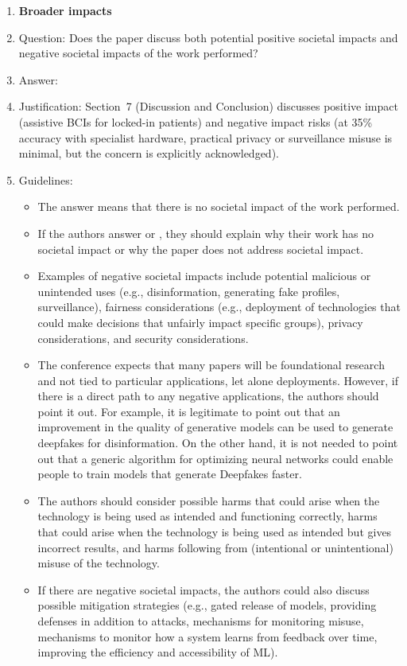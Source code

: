 \documentclass{article}
\begin{document}
\begin{enumerate}
\item {\bf Broader impacts}
    \item[] Question: Does the paper discuss both potential positive societal impacts and negative societal impacts of the work performed?
    \item[] Answer: \answerYes{}
    \item[] Justification: Section~7 (Discussion and Conclusion) discusses positive impact (assistive BCIs for locked-in patients) and negative impact risks (at 35\% accuracy with specialist hardware, practical privacy or surveillance misuse is minimal, but the concern is explicitly acknowledged).
    \item[] Guidelines:
    \begin{itemize}
        \item The answer \answerNA{} means that there is no societal impact of the work performed.
        \item If the authors answer \answerNA{} or \answerNo{}, they should explain why their work has no societal impact or why the paper does not address societal impact.
        \item Examples of negative societal impacts include potential malicious or unintended uses (e.g., disinformation, generating fake profiles, surveillance), fairness considerations (e.g., deployment of technologies that could make decisions that unfairly impact specific groups), privacy considerations, and security considerations.
        \item The conference expects that many papers will be foundational research and not tied to particular applications, let alone deployments. However, if there is a direct path to any negative applications, the authors should point it out. For example, it is legitimate to point out that an improvement in the quality of generative models can be used to generate deepfakes for disinformation. On the other hand, it is not needed to point out that a generic algorithm for optimizing neural networks could enable people to train models that generate Deepfakes faster.
        \item The authors should consider possible harms that could arise when the technology is being used as intended and functioning correctly, harms that could arise when the technology is being used as intended but gives incorrect results, and harms following from (intentional or unintentional) misuse of the technology.
        \item If there are negative societal impacts, the authors could also discuss possible mitigation strategies (e.g., gated release of models, providing defenses in addition to attacks, mechanisms for monitoring misuse, mechanisms to monitor how a system learns from feedback over time, improving the efficiency and accessibility of ML).
    \end{itemize}


\end{enumerate}
\end{document}

